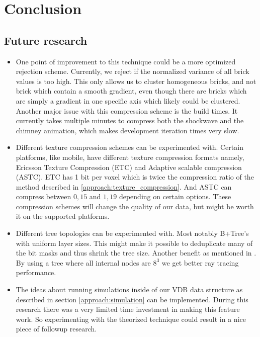 \section{Conclusion} \label{conclusion}


\subsection{Future research} \label{conclusion:future_research}

\begin{itemize}
    \item One point of improvement to this technique could be a more optimized rejection scheme. Currently, we reject if the normalized variance of all brick values is too high. This only allows us to cluster homogeneous bricks, and not brick which contain a smooth gradient, even though there are bricks which are simply a gradient in one specific axis which likely could be clustered. Another major issue with this compression scheme is the build times. It currently takes multiple minutes to compress both the shockwave and the chimney animation, which makes development iteration times very slow.
    \item Different texture compression schemes can be experimented with. Certain platforms, like mobile, have different texture compression formats namely, Ericsson Texture Compression (ETC) and Adaptive scalable compression (ASTC). ETC has 1 bit per voxel which is twice the compression ratio of the method described in \ref{approach:texture_compression}. And ASTC can compress between $0,15$ and $1,19$ depending on certain options. These compression schemes will change the quality of our data, but might be worth it on the supported platforms.
    \item Different tree topologies can be experimented with. Most notably B+Tree's with uniform layer sizes. This might make it possible to deduplicate many of the bit masks and thus shrink the tree size. Another benefit as mentioned in \cite{hoetzlein2016gvdb}. By using a tree where all internal nodes are $8^3$ we get better ray tracing performance.
    \item The ideas about running simulations inside of our VDB data structure as described in section \ref{approach:simulation} can be implemented. During this research there was a very limited time investment in making this feature work. So experimenting with the theorized technique could result in a nice piece of followup research.
\end{itemize}





